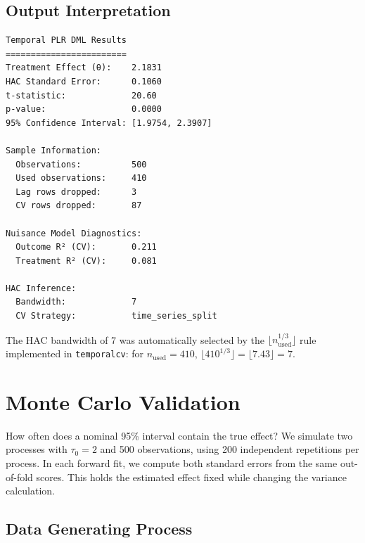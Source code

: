 \subsection{Output Interpretation}

\begin{verbatim}
Temporal PLR DML Results
========================
Treatment Effect (θ):    2.1831
HAC Standard Error:      0.1060
t-statistic:             20.60
p-value:                 0.0000
95% Confidence Interval: [1.9754, 2.3907]

Sample Information:
  Observations:          500
  Used observations:     410
  Lag rows dropped:      3
  CV rows dropped:       87

Nuisance Model Diagnostics:
  Outcome R² (CV):       0.211
  Treatment R² (CV):     0.081

HAC Inference:
  Bandwidth:             7
  CV Strategy:           time_series_split
\end{verbatim}

\begin{remark}
The HAC bandwidth of 7 was automatically selected by the $\lfloor n_{\text{used}}^{1/3} \rfloor$ rule implemented in \texttt{temporalcv}: for $n_{\text{used}}=410$, $\lfloor 410^{1/3} \rfloor = \lfloor 7.43 \rfloor = 7$.
\end{remark}

\section{Monte Carlo Validation}\label{sec:monte_carlo_validation}

How often does a nominal 95\% interval contain the true effect? We simulate two processes with $\tau_0=2$ and 500 observations, using 200 independent repetitions per process. In each forward fit, we compute both standard errors from the same out-of-fold scores. This holds the estimated effect fixed while changing the variance calculation.

\subsection{Data Generating Process}

